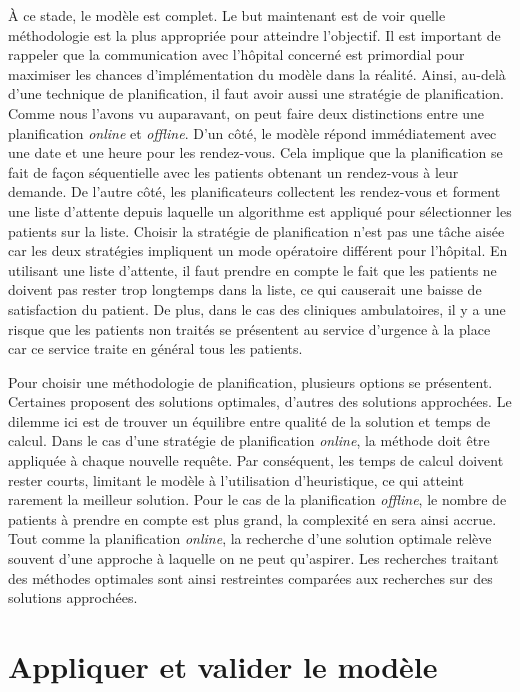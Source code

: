 \documentclass{polytech/polytech}
\begin{document}
À ce stade, le modèle est complet. Le but maintenant est de voir quelle méthodologie est la plus appropriée pour atteindre l'objectif. Il est important de rappeler que la communication avec l'hôpital concerné est primordial pour maximiser les chances d'implémentation du modèle dans la réalité. Ainsi, au-delà d'une technique de planification, il faut avoir aussi une stratégie de planification. Comme nous l'avons vu auparavant, on peut faire deux distinctions entre une planification \textit{online} et \textit{offline}. D'un côté, le modèle répond immédiatement avec une date et une heure pour les rendez-vous. Cela implique que la planification se fait de façon séquentielle avec les patients obtenant un rendez-vous à leur demande. De l'autre côté, les planificateurs collectent les rendez-vous et forment une liste d'attente depuis laquelle un algorithme est appliqué pour sélectionner les patients sur la liste. Choisir la stratégie de planification n'est pas une tâche aisée car les deux stratégies impliquent un mode opératoire différent pour l'hôpital. En utilisant une liste d'attente, il faut prendre en compte le fait que les patients ne doivent pas rester trop longtemps dans la liste, ce qui causerait une baisse de satisfaction du patient. De plus, dans le cas des cliniques ambulatoires, il y a une risque que les patients non traités se présentent au service d'urgence à la place car ce service traite en général tous les patients.

Pour choisir une méthodologie de planification, plusieurs options se présentent. Certaines proposent des solutions optimales, d'autres des solutions approchées. Le dilemme ici est de trouver un équilibre entre qualité de la solution et temps de calcul. Dans le cas d'une stratégie de planification \textit{online}, la méthode doit être appliquée à chaque nouvelle requête. Par conséquent, les temps de calcul doivent rester courts, limitant le modèle à l'utilisation d'heuristique, ce qui atteint rarement la meilleur solution. Pour le cas de la planification \textit{offline}, le nombre de patients à prendre en compte est plus grand, la complexité en sera ainsi accrue. Tout comme la planification \textit{online}, la recherche d'une solution optimale relève souvent d'une approche à laquelle on ne peut qu'aspirer. Les recherches traitant des méthodes optimales sont ainsi restreintes comparées aux recherches sur des solutions approchées. 


\section{Appliquer et valider le modèle}
\end{document}

